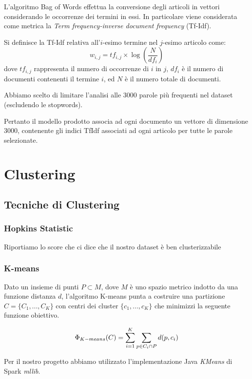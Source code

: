\documentclass[
	11pt, %
	a4paper, %
	oneside, %
	headinclude,footinclude, %
	BCOR5mm, %
]{scrartcl}
\begin{document}
	L'algoritmo Bag of Words\cite{bagofwords} effettua la conversione degli articoli in vettori considerando le occorrenze dei termini in essi.
	In particolare viene considerata come metrica la \textit{Term frequency-inverse document frequency} (Tf-Idf).

	Si definisce la Tf-Idf relativa all'$i$-esimo termine nel $j$-esimo articolo come:
	$$ w_{i,j}=tf_{i,j}\times\log \left(\frac{N}{df_{i}} \right) $$
	dove $tf_{i,j}$ rappresenta il numero di occorrenze di $i$ in $j$, $df_{i}$ è il numero di documenti contenenti il termine $i$, ed $N$ è il numero totale di documenti.

	Abbiamo scelto di limitare l'analisi alle 3000 parole pi\`{u} frequenti nel dataset (escludendo le stopwords).

	Pertanto il modello prodotto associa ad ogni documento un vettore di dimensione 3000, contenente gli indici TfIdf associati ad ogni articolo per tutte le parole selezionate.

\section{Clustering}

	\subsection{Tecniche di Clustering}

		\subsubsection{Hopkins Statistic}
			Riportiamo lo score che ci dice che il nostro dataset è ben clusterizzabile

		\subsubsection{K-means}
			Dato un insieme di punti $P \subset M$, dove $M$ è uno spazio metrico indotto da una funzione distanza $d$, l'algoritmo K-means punta a costruire una partizione $C = \{ C_1, ..., C_K \}$ con centri dei cluster $\{ c_1, ..., c_K\}$ che minimizzi la seguente funzione obiettivo.

			\begin{equation}
				\Phi_{K-means} (C) = \sum_{i=1}^K \sum_{p \in C_i \cap P} d(p, c_i) \\
			\end{equation}

			Per il nostro progetto abbiamo utilizzato l'implementazione Java \emph{KMeans} di Spark \emph{mllib}.
\end{document}
